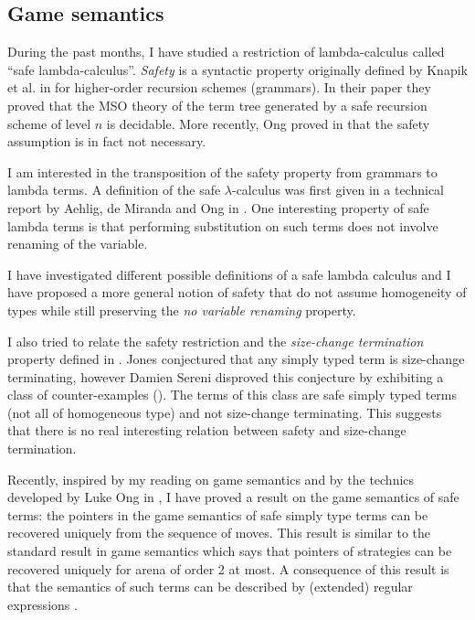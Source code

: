 \subsection{Game semantics}

During the past months, I have studied a restriction of
lambda-calculus called ``safe lambda-calculus''. \emph{Safety} is a
syntactic property originally defined by Knapik et al. in
\cite{KNU02} for higher-order recursion schemes (grammars). In their
paper they proved that the MSO theory of the term tree generated by
a safe recursion scheme of level $n$ is decidable. More recently,
Ong proved in \cite{OngLics2006} that the safety assumption is in
fact not necessary.

I am interested in the transposition of the safety property from
grammars to lambda terms. A definition of the safe
$\lambda$-calculus was first given in a technical report by Aehlig,
de Miranda and Ong in \cite{safety-mirlong2004}. One interesting
property of safe lambda terms is that performing substitution on
such terms does not involve renaming of the variable.

I have investigated different possible definitions of a safe lambda
calculus and I have proposed a more general notion of safety that do
not assume homogeneity of types while still preserving  the \emph{no
variable renaming} property.

I also tried to relate the safety restriction and the
\emph{size-change termination} property defined in
\cite{jones01,jones04}. Jones conjectured that any simply typed term
is size-change terminating, however Damien Sereni disproved this
conjecture by exhibiting a class of counter-examples
(\cite{serenistypesct05}). The terms of this class are safe simply
typed terms (not all of homogeneous type) and not size-change
terminating. This suggests that there is no real interesting
relation between safety and size-change termination.


Recently, inspired by my reading on game semantics
\citep{abramsky:game-semantics-tutorial} and by the technics
developed by Luke Ong in \citep{OngLics2006}, I have proved a result
on the game semantics of safe terms: the pointers in the game
semantics of safe simply type terms can be recovered uniquely from
the sequence of moves. This result is similar to the standard result
in game semantics which says that pointers of strategies can be
recovered uniquely for arena of order 2 at most. A consequence of
this result is that the semantics of such terms can be described by
(extended) regular expressions \cite{ghicamccusker00}.


